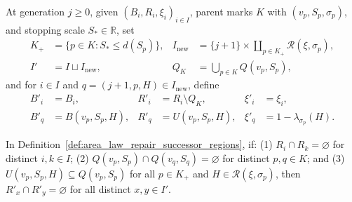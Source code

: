 \begin{definition}
    \label{def:area_law_repair_successor_regions}
    \leanok
    At generation $j\ge0$, given $(B_i,R_i,\xi_i)_{i\in I}$, parent marks $K$ with $(v_p,S_p,\sigma_p)$,
    and stopping scale $S_*\in\mathbb R$, set
    \begin{align}
        K_+ & =\{p\in K:S_*\le d(S_p)\},
            & I_{\mathrm{new}}           & =\{j+1\}\times\coprod_{p\in K_+}\mathcal R(\xi,\sigma_p), \\
        I'  & =I\sqcup I_{\mathrm{new}},
            & Q_K                        & =\bigcup_{p\in K}Q(v_p,S_p),
        \label{eq:area_law_repair_indices}
    \end{align}
    and for $i\in I$ and $q=(j+1,p,H)\in I_{\mathrm{new}}$, define
    \begin{align}
        B'_i & =B_i,
             & R'_i           & =R_i\setminus Q_K,
             & \xi'_i         & =\xi_i,                   \\
        B'_q & =B(v_p,S_p,H),
             & R'_q           & =U(v_p,S_p,H),
             & \xi'_q         & =1-\lambda_{\sigma_p}(H).
        \label{eq:area_law_repair_successor}
    \end{align}
\end{definition}

\begin{lemma}
    \label{thm:area_law_repair_next_disjoint}
    \leanok
    In Definition~\ref{def:area_law_repair_successor_regions}, if:
    (1) $R_i\cap R_k=\varnothing$ for distinct $i,k\in I$;
    (2) $Q(v_p,S_p)\cap Q(v_q,S_q)=\varnothing$ for distinct $p,q\in K$; and
    (3) $U(v_p,S_p,H)\subseteq Q(v_p,S_p)$ for all $p\in K_+$ and $H\in\mathcal R(\xi,\sigma_p)$,
    then $R'_x\cap R'_y=\varnothing$ for all distinct $x,y\in I'$.
\end{lemma}

